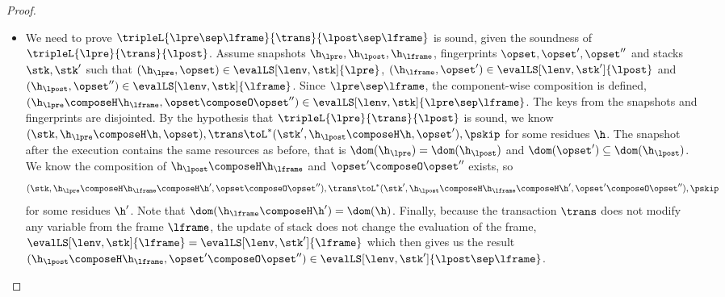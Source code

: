 \begin{proof}
\begin{itemize}
\item {}
We need to prove \( \tripleL{\lpre \sep \lframe }{\trans}{\lpost \sep \lframe} \) is sound, 
given the soundness of  \( \tripleL{\lpre}{\trans}{\lpost} \).
Assume snapshots \( \h_\lpre, \h_\lpost, \h_\lframe \), fingerprints \( \opset, \opset', \opset'' \) and stacks\( \stk, \stk' \) 
such that \( ( \h_\lpre, \opset ) \in \evalLS[\lenv, \stk]{\lpre} \), \( ( \h_\lframe, \opset' ) \in \evalLS[\lenv, \stk']{\lpost} \) and \( ( \h_\lpost, \opset'' ) \in \evalLS[\lenv, \stk]{\lframe}\).
Since \( \lpre \sep \lframe \), the component-wise composition is defined, \ie \( (\h_\lpre \composeH \h_\lframe, \opset \composeO \opset'') \in \evalLS[\lenv, \stk]{\lpre \sep \lframe} \).
The keys from the snapshots and fingerprints are disjointed.
By the hypothesis that \( \tripleL{\lpre}{\trans}{\lpost} \) is sound, 
we know \( ( \stk, \h_\lpre \composeH \h, \opset ), \trans \toL^{*} ( \stk', \h_\lpost \composeH \h, \opset' ), \pskip \) for some residues \( \h \).
The snapshot after the execution contains the same resources as before, that is \( \dom(\h_\lpre) = \dom(\h_\lpost) \) and \( \dom(\opset') \subseteq \dom(\h_\lpost) \).
We know the composition of \( \h_\lpost \composeH \h_\lframe \) and \( \opset' \composeO \opset''\) exists, 
so 
\[ 
    ( \stk, \h_\lpre \composeH \h_\lframe \composeH \h', \opset \composeO \opset''), \trans \toL^{*} ( \stk', \h_\lpost \composeH \h_\lframe \composeH \h', \opset' \composeO \opset'' ), \pskip 
\]
for some residues \( \h' \).
Note that \( \dom(\h_\lframe \composeH \h') = \dom(\h) \).
Finally, because the transaction \( \trans \) does not modify any variable from the frame \( \lframe \), 
the update of stack does not change the evaluation of the frame, 
\( \evalLS[\lenv, \stk]{\lframe} = \evalLS[\lenv, \stk']{\lframe} \) which then gives us the result \( (\h_\lpost \composeH \h_\lframe, \opset' \composeO \opset'') \in \evalLS[\lenv, \stk']{\lpost \sep \lframe} \).
\end{itemize}
\end{proof}


